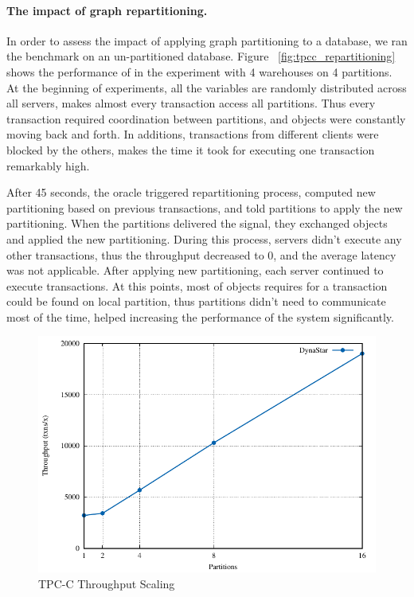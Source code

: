 \paragraph{The impact of graph repartitioning.}
In order to assess the impact of applying graph partitioning to a database, we
ran the benchmark on an un-partitioned database.  Figure ~\ref{fig:tpcc_repartitioning} 
shows the performance of \dynastar in the experiment with 4 warehouses on 4 partitions.
At the beginning of experiments, all the variables are randomly distributed across all 
servers, makes almost every transaction access all partitions. Thus every transaction 
required coordination between partitions, and objects were constantly moving back and forth. 
In additions, transactions from different clients were blocked by the others, 
makes the time it took for executing one transaction remarkably high.


After 45 seconds, the oracle triggered repartitioning process, computed new partitioning 
based on previous transactions, and told partitions to apply the new partitioning.
When the partitions delivered the signal, they exchanged objects and applied the new partitioning.
During this process, servers didn't execute any other transactions, thus the throughput decreased 
to 0, and the average latency was not applicable. After applying new partitioning, each 
server continued to execute transactions. At this points, most of objects requires for a transaction
could be found on local partition, thus partitions didn't need to communicate most of the time, helped
increasing the performance of the system significantly.

\begin{figure}[ht!]
  \centering
    \includegraphics[width=\columnwidth]{figures/experiments/tpcc-scaling/tpcc-scaling}
  \caption{TPC-C Throughput Scaling}
  \label{fig:tpcc_scaling}
\end{figure}
